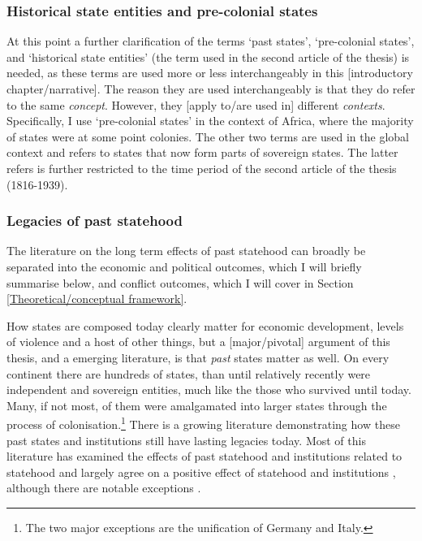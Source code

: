 \documentclass[12pt]{article}
\begin{document}
\subsubsection{Historical state entities and pre-colonial states} 
\label{Historical state entities and Pre-colonial states}

At this point a further clarification of the terms `past states',
`pre-colonial states', and `historical state entities' (the term used in the
second article of the thesis) is needed, as these terms are used more or less
interchangeably in this [introductory chapter/narrative]. The reason they are
used interchangeably is that they do refer to the same \textit{concept}.
However, they [apply to/are used in] different \textit{contexts}. Specifically,
I use `pre-colonial states' in the context of Africa, where the majority of
states were at some point colonies. The other two terms are used in the global
context and refers to states that now form parts of sovereign states. The latter
refers is further restricted to the time period of the second article of the
thesis (1816-1939).

\subsubsection{Legacies of past statehood} \label{Legacies} 

The literature on the long term effects of past statehood can broadly be
separated into the economic and political outcomes, which I will briefly
summarise below, and conflict outcomes, which I will cover in Section
\ref{Theoretical/conceptual framework}.

How states are composed today clearly matter for economic development, levels of
violence and a host of other things, but a [major/pivotal] argument of this
thesis, and a emerging literature, is that \textit{past} states matter as well.
On every continent there are hundreds of states, than until relatively recently
were independent and sovereign entities, much like the those who survived until
today. Many, if not most, of them were amalgamated into larger states through
the process of colonisation.\footnote{The two major exceptions are the
unification of Germany and Italy.} There is a growing literature demonstrating
how these past states and institutions still have lasting legacies today. Most
of this literature has examined the effects of past statehood
\citep{Bockstette2002, Borcan2018} and institutions related to statehood
\citep{Michalopoulos2013, Michalopoulos2018, Englebert2000} and largely agree on
a positive effect of statehood and institutions \citep{Nunn_2020,
Michalopoulos2016}, although there are notable exceptions \citep{Acemoglu_2002}.
\end{document}
